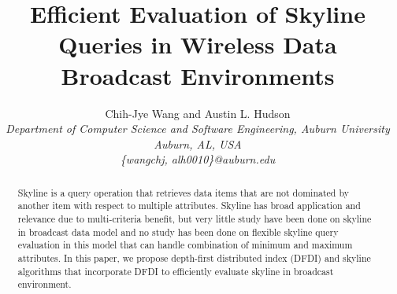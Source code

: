 \documentclass[10pt,conference,letterpaper]{IEEEtran}
\begin{document}
\title{Efficient Evaluation of Skyline Queries in Wireless Data Broadcast Environments}



\author{
Chih-Jye Wang and Austin L. Hudson
\vspace{1.6mm}\\
\fontsize{10}{10}\selectfont\itshape
Department of Computer Science and Software Engineering, Auburn University\\
Auburn, AL, USA\\
\fontsize{9}{9}\selectfont\ttfamily\upshape
\{wangchj, alh0010\}@auburn.edu\\
}



\maketitle

\begin{abstract}

Skyline is a query operation that retrieves data items that are not
dominated by another item with respect to multiple attributes.
Skyline has broad application and relevance due to multi-criteria benefit,
but very little study have been done on skyline in broadcast data model
and no study has been done on flexible skyline query evaluation in this
model that can handle combination of minimum and maximum attributes.
In this paper, we propose depth-first distributed index (DFDI) and
skyline algorithms that incorporate DFDI to efficiently evaluate
skyline in broadcast environment.

\end{abstract}
\end{document}
